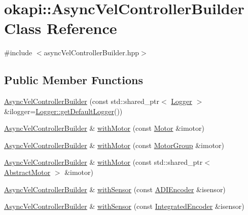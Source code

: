 \hypertarget{classokapi_1_1AsyncVelControllerBuilder}{}\section{okapi\+::Async\+Vel\+Controller\+Builder Class Reference}
\label{classokapi_1_1AsyncVelControllerBuilder}


{\ttfamily \#include $<$async\+Vel\+Controller\+Builder.\+hpp$>$}

\subsection*{Public Member Functions}
\begin{DoxyCompactItemize}
\item 
\mbox{\hyperlink{classokapi_1_1AsyncVelControllerBuilder_a2240959e5feeb59b630fe93e6e993996}{Async\+Vel\+Controller\+Builder}} (const std\+::shared\+\_\+ptr$<$ \mbox{\hyperlink{classokapi_1_1Logger}{Logger}} $>$ \&ilogger=\mbox{\hyperlink{classokapi_1_1Logger_a5053cf778b4b55acba788a3797dc96d2}{Logger\+::get\+Default\+Logger}}())
\item 
\mbox{\hyperlink{classokapi_1_1AsyncVelControllerBuilder}{Async\+Vel\+Controller\+Builder}} \& \mbox{\hyperlink{classokapi_1_1AsyncVelControllerBuilder_a64b047406f6aa211691f99b2da80fd29}{with\+Motor}} (const \mbox{\hyperlink{classokapi_1_1Motor}{Motor}} \&imotor)
\item 
\mbox{\hyperlink{classokapi_1_1AsyncVelControllerBuilder}{Async\+Vel\+Controller\+Builder}} \& \mbox{\hyperlink{classokapi_1_1AsyncVelControllerBuilder_a8c818cb67b99b64722df86a1e391c7da}{with\+Motor}} (const \mbox{\hyperlink{classokapi_1_1MotorGroup}{Motor\+Group}} \&imotor)
\item 
\mbox{\hyperlink{classokapi_1_1AsyncVelControllerBuilder}{Async\+Vel\+Controller\+Builder}} \& \mbox{\hyperlink{classokapi_1_1AsyncVelControllerBuilder_aadd1a0eb89fb1c5dad47b1700f953ff1}{with\+Motor}} (const std\+::shared\+\_\+ptr$<$ \mbox{\hyperlink{classokapi_1_1AbstractMotor}{Abstract\+Motor}} $>$ \&imotor)
\item 
\mbox{\hyperlink{classokapi_1_1AsyncVelControllerBuilder}{Async\+Vel\+Controller\+Builder}} \& \mbox{\hyperlink{classokapi_1_1AsyncVelControllerBuilder_a611d50478ee813ce9b0c5b5ed113d6db}{with\+Sensor}} (const \mbox{\hyperlink{classokapi_1_1ADIEncoder}{A\+D\+I\+Encoder}} \&isensor)
\item 
\mbox{\hyperlink{classokapi_1_1AsyncVelControllerBuilder}{Async\+Vel\+Controller\+Builder}} \& \mbox{\hyperlink{classokapi_1_1AsyncVelControllerBuilder_a3f21552feaedb4592289c32d3cd20b05}{with\+Sensor}} (const \mbox{\hyperlink{classokapi_1_1IntegratedEncoder}{Integrated\+Encoder}} \&isensor)

\end{DoxyCompactItemize}
